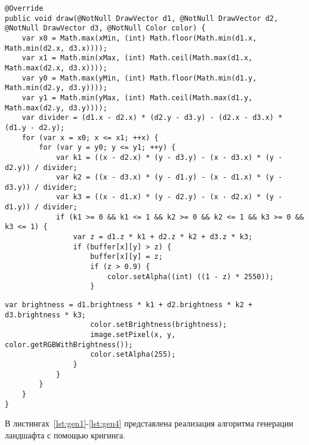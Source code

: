 \begin{lstlisting}[label=lst:z-buffer1,caption=Реализация алгоритма отрисовки полигона (часть~1)]
@Override
public void draw(@NotNull DrawVector d1, @NotNull DrawVector d2, @NotNull DrawVector d3, @NotNull Color color) {
	var x0 = Math.max(xMin, (int) Math.floor(Math.min(d1.x, Math.min(d2.x, d3.x))));
	var x1 = Math.min(xMax, (int) Math.ceil(Math.max(d1.x, Math.max(d2.x, d3.x))));
	var y0 = Math.max(yMin, (int) Math.floor(Math.min(d1.y, Math.min(d2.y, d3.y))));
	var y1 = Math.min(yMax, (int) Math.ceil(Math.max(d1.y, Math.max(d2.y, d3.y))));
	var divider = (d1.x - d2.x) * (d2.y - d3.y) - (d2.x - d3.x) * (d1.y - d2.y);
	for (var x = x0; x <= x1; ++x) {
		for (var y = y0; y <= y1; ++y) {
			var k1 = ((x - d2.x) * (y - d3.y) - (x - d3.x) * (y - d2.y)) / divider;
			var k2 = ((x - d3.x) * (y - d1.y) - (x - d1.x) * (y - d3.y)) / divider;
			var k3 = ((x - d1.x) * (y - d2.y) - (x - d2.x) * (y - d1.y)) / divider;
			if (k1 >= 0 && k1 <= 1 && k2 >= 0 && k2 <= 1 && k3 >= 0 && k3 <= 1) {
				var z = d1.z * k1 + d2.z * k2 + d3.z * k3;
				if (buffer[x][y] > z) {
					buffer[x][y] = z;
					if (z > 0.9) {
						color.setAlpha((int) ((1 - z) * 2550));
					}
\end{lstlisting}
\clearpage
\begin{lstlisting}[label=lst:z-buffer2,caption=Реализация алгоритма отрисовки полигона (часть~2)]
					var brightness = d1.brightness * k1 + d2.brightness * k2 + d3.brightness * k3;
					color.setBrightness(brightness);
					image.setPixel(x, y, color.getRGBWithBrightness());
					color.setAlpha(255);
				}
			}
		}
	}
}
\end{lstlisting}

В листингах~\ref{lst:gen1}-\ref{lst:gen4} представлена реализация алгоритма генерации ландшафта с помощью кригинга.

